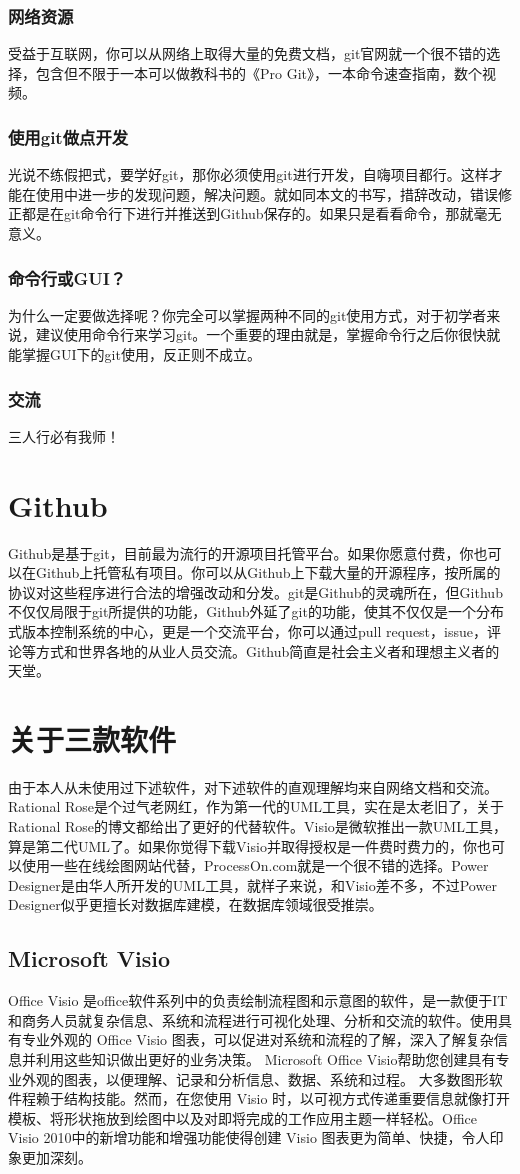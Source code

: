\documentclass{article}
\begin{document}
	\subsubsection{网络资源}
	受益于互联网，你可以从网络上取得大量的免费文档，git官网就一个很不错的选择，包含但不限于一本可以做教科书的《Pro Git》，一本命令速查指南，数个视频。
	\subsubsection{使用git做点开发}
	光说不练假把式，要学好git，那你必须使用git进行开发，自嗨项目都行。这样才能在使用中进一步的发现问题，解决问题。就如同本文的书写，措辞改动，错误修正都是在git命令行下进行并推送到Github保存的。如果只是看看命令，那就毫无意义。
	\subsubsection{命令行或GUI？}
	为什么一定要做选择呢？你完全可以掌握两种不同的git使用方式，对于初学者来说，建议使用命令行来学习git。一个重要的理由就是，掌握命令行之后你很快就能掌握GUI下的git使用，反正则不成立。
	\subsubsection{交流}
	三人行必有我师！
	\section{Github}
	Github是基于git，目前最为流行的开源项目托管平台。如果你愿意付费，你也可以在Github上托管私有项目。你可以从Github上下载大量的开源程序，按所属的协议对这些程序进行合法的增强改动和分发。git是Github的灵魂所在，但Github不仅仅局限于git所提供的功能，Github外延了git的功能，使其不仅仅是一个分布式版本控制系统的中心，更是一个交流平台，你可以通过pull request，issue，评论等方式和世界各地的从业人员交流。Github简直是社会主义者和理想主义者的天堂。
	\section{关于三款软件}
	由于本人从未使用过下述软件，对下述软件的直观理解均来自网络文档和交流。Rational Rose是个过气老网红，作为第一代的UML工具，实在是太老旧了，关于Rational Rose的博文都给出了更好的代替软件。Visio是微软推出一款UML工具，算是第二代UML了。如果你觉得下载Visio并取得授权是一件费时费力的，你也可以使用一些在线绘图网站代替，ProcessOn.com就是一个很不错的选择。Power Designer是由华人所开发的UML工具，就样子来说，和Visio差不多，不过Power Designer似乎更擅长对数据库建模，在数据库领域很受推崇。
	\subsection{Microsoft Visio}
	Office Visio 是office软件系列中的负责绘制流程图和示意图的软件，是一款便于IT和商务人员就复杂信息、系统和流程进行可视化处理、分析和交流的软件。使用具有专业外观的 Office Visio 图表，可以促进对系统和流程的了解，深入了解复杂信息并利用这些知识做出更好的业务决策。
	Microsoft Office Visio帮助您创建具有专业外观的图表，以便理解、记录和分析信息、数据、系统和过程。
	大多数图形软件程赖于结构技能。然而，在您使用 Visio 时，以可视方式传递重要信息就像打开模板、将形状拖放到绘图中以及对即将完成的工作应用主题一样轻松。Office Visio 2010中的新增功能和增强功能使得创建 Visio 图表更为简单、快捷，令人印象更加深刻。
\end{document}
